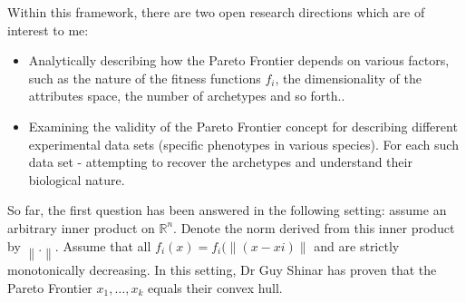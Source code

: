 \documentclass{article}
\theoremstyle{definition}
\theoremstyle{remark}
\def \norm [#1]{\left\| #1 \right\|}
\begin{document}
Within this framework, there are two open research directions which are of interest to me:
\begin{itemize} 
\item Analytically describing how the Pareto Frontier depends on various factors, such as the nature of the fitness functions $f_i$, 
the dimensionality of the attributes space,  the number of archetypes and so forth..
\item Examining the validity of the Pareto Frontier concept for describing different experimental data sets (specific phenotypes in various species). 
For each such data set - attempting to recover the archetypes and understand their biological nature.
\end{itemize}

So far, the first question has been answered in the following setting: 
assume an arbitrary inner product on $\mathbb{R}^n$. 
Denote the norm derived from this inner product by $\norm[.]$. 
Assume that all $f_i(x) = f_i(\norm[(x-xi)]$ and are strictly monotonically decreasing. 
In this setting, Dr Guy Shinar has proven that the Pareto Frontier $x_1,\ldots,x_k$ equals their convex hull.
\end{document}
